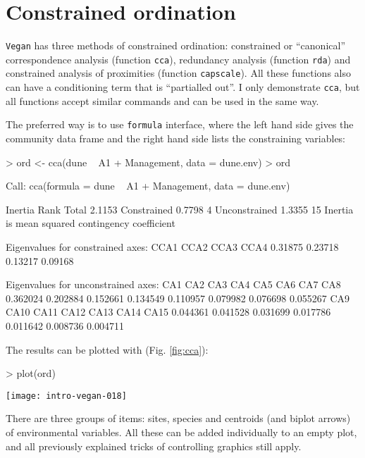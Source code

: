 \documentclass[a4paper,10pt]{amsart}
\begin{document}
\section{Constrained ordination}

\texttt{Vegan} has three methods of constrained ordination:
constrained or ``canonical'' correspondence analysis (function
\texttt{cca}), redundancy analysis (function \texttt{rda}) and
constrained analysis of proximities (function \texttt{capscale}).  All
these functions also can have a conditioning term that is ``partialled
out''.  I only demonstrate \texttt{cca}, but all functions accept
similar commands and can be used in the same way.

The preferred way is to use \texttt{formula} interface, where the left
hand side gives the community data frame and the right hand side lists
the constraining variables:
\begin{Schunk}
\begin{Sinput}
> ord <- cca(dune ~ A1 + Management, data = dune.env)
> ord
\end{Sinput}
\begin{Soutput}
Call: cca(formula = dune ~ A1 + Management, data = dune.env)

              Inertia Rank
Total          2.1153     
Constrained    0.7798    4
Unconstrained  1.3355   15
Inertia is mean squared contingency coefficient 

Eigenvalues for constrained axes:
   CCA1    CCA2    CCA3    CCA4 
0.31875 0.23718 0.13217 0.09168 

Eigenvalues for unconstrained axes:
     CA1      CA2      CA3      CA4      CA5      CA6      CA7      CA8 
0.362024 0.202884 0.152661 0.134549 0.110957 0.079982 0.076698 0.055267 
     CA9     CA10     CA11     CA12     CA13     CA14     CA15 
0.044361 0.041528 0.031699 0.017786 0.011642 0.008736 0.004711 
\end{Soutput}
\end{Schunk}
The results can be plotted with (Fig. \ref{fig:cca}):
\begin{Schunk}
\begin{Sinput}
> plot(ord)
\end{Sinput}
\end{Schunk}
\begin{SCfigure}
\texttt{[image: intro-vegan-018]}
\caption{Default plot from constrained correspondence analysis.}
\label{fig:cca}
\end{SCfigure}
There are three groups of items: sites, species and centroids (and
biplot arrows) of environmental variables.  All these can be added
individually to an empty plot, and all previously explained tricks of
controlling graphics still apply.
\end{document}
